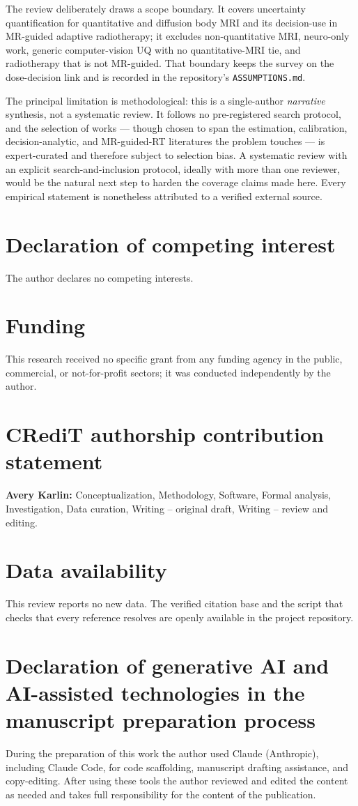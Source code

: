 \documentclass[review,number]{elsarticle}
\begin{document}
The review deliberately draws a scope boundary. It covers uncertainty quantification for
quantitative and diffusion body MRI and its decision-use in MR-guided adaptive
radiotherapy; it excludes non-quantitative MRI, neuro-only work, generic computer-vision
UQ with no quantitative-MRI tie, and radiotherapy that is not MR-guided. That boundary
keeps the survey on the dose-decision link and is recorded in the repository's
\texttt{ASSUMPTIONS.md}.

The principal limitation is methodological: this is a single-author \emph{narrative}
synthesis, not a systematic review. It follows no pre-registered search protocol, and the
selection of works --- though chosen to span the estimation, calibration,
decision-analytic, and MR-guided-RT literatures the problem touches --- is expert-curated
and therefore subject to selection bias. A systematic review with an explicit
search-and-inclusion protocol, ideally with more than one reviewer, would be the natural
next step to harden the coverage claims made here. Every empirical statement is
nonetheless attributed to a verified external source.

\section*{Declaration of competing interest}
The author declares no competing interests.

\section*{Funding}
This research received no specific grant from any funding agency in the public,
commercial, or not-for-profit sectors; it was conducted independently by the author.

\section*{CRediT authorship contribution statement}
\textbf{Avery Karlin:} Conceptualization, Methodology, Software, Formal analysis,
Investigation, Data curation, Writing -- original draft, Writing -- review and editing.

\section*{Data availability}
This review reports no new data. The verified citation base and the script that checks
that every reference resolves are openly available in the project repository.

\section*{Declaration of generative AI and AI-assisted technologies in the manuscript preparation process}
During the preparation of this work the author used Claude (Anthropic), including Claude
Code, for code scaffolding, manuscript drafting assistance, and copy-editing. After using
these tools the author reviewed and edited the content as needed and takes full
responsibility for the content of the publication.



\end{document}

